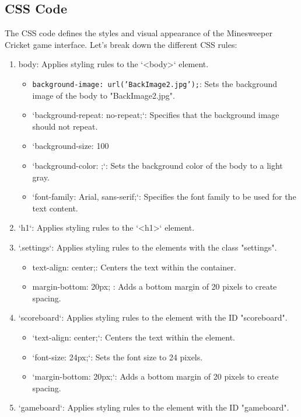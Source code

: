 \documentclass{article}
\begin{document}
\subsection{CSS Code}
The CSS code defines the styles and visual appearance of the Minesweeper Cricket game interface. Let's break down the different CSS rules:
\begin{enumerate}
    

\item  body: Applies styling rules to the `<body>` element.
\begin{itemize}
    

   \item  \texttt{background-image: url('BackImage2.jpg');}: Sets the background image of the body to "BackImage2.jpg".
   \item  `background-repeat: no-repeat;`: Specifies that the background image should not repeat.
   \item  `background-size: 100%
   \item  `background-color: ;`: Sets the background color of the body to a light gray.
   \item  `font-family: Arial, sans-serif;`: Specifies the font family to be used for the text content.
\end{itemize}
\item `h1`: Applies styling rules to the `<h1>` element.
\item  `.settings`: Applies styling rules to the elements with the class "settings".
\begin{itemize}
    

   \item  text-align: center;: Centers the text within the container.
   \item margin-bottom: 20px; : Adds a bottom margin of 20 pixels to create spacing.
\end{itemize}
\item  `scoreboard`: Applies styling rules to the element with the ID "scoreboard".
\begin{itemize}
   

    \item  `text-align: center;`: Centers the text within the element.
    \item `font-size: 24px;`: Sets the font size to 24 pixels.
    \item `margin-bottom: 20px;`: Adds a bottom margin of 20 pixels to create spacing.
\end{itemize}
\item  `gameboard`: Applies styling rules to the element with the ID "gameboard".
\begin{itemize}
     


\end{itemize}
\end{enumerate}
\end{document}
